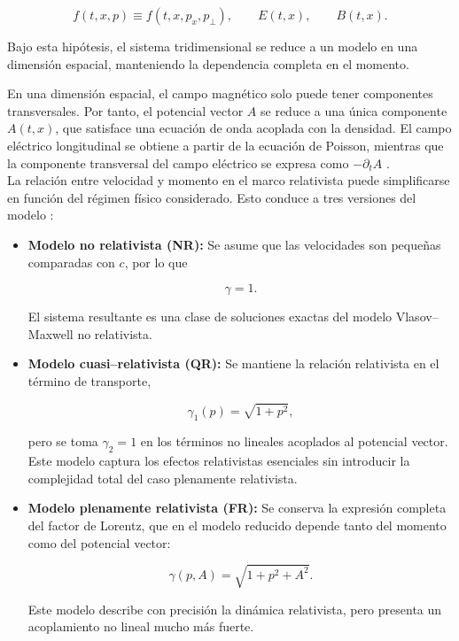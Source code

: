 \documentclass[11pt,a4paper,twoside,pdf]{article}
\numberwithin{equation}{section}
\begin{document}
\[
f(t,x,p) \equiv f(t,x,p_x,p_\perp), \qquad
E(t,x), \qquad B(t,x).
\]


Bajo esta hipótesis, el sistema tridimensional se reduce a un modelo en una dimensión
espacial, manteniendo la dependencia completa en el momento.



En una dimensión espacial, el campo magnético solo puede tener componentes
transversales. Por tanto, el potencial vector $A$ se reduce a una única componente
$A(t,x)$, que satisface una ecuación de onda acoplada con la densidad.
El campo eléctrico longitudinal se obtiene a partir de la ecuación de Poisson, mientras
que la componente transversal del campo eléctrico se expresa como $-\partial_t A$ \cite{martin2021campo}.\\


La relación entre velocidad y momento en el marco relativista puede simplificarse en función del régimen físico
considerado. Esto conduce a tres versiones del modelo \cite{janssen2022gravitacion}:

\begin{itemize}
\item \textbf{Modelo no relativista (NR):}  
Se asume que las velocidades son pequeñas comparadas con $c$, por lo que  


\[
\gamma = 1.
\]


El sistema resultante es una clase de soluciones exactas del modelo
Vlasov–Maxwell no relativista.

\item \textbf{Modelo cuasi–relativista (QR):}  
Se mantiene la relación relativista en el término de transporte,


\[
\gamma_1(p)=\sqrt{1+p^2},
\]


pero se toma $\gamma_2=1$ en los términos no lineales acoplados al potencial
vector. Este modelo captura los efectos relativistas esenciales sin introducir la
complejidad total del caso plenamente relativista.

\item \textbf{Modelo plenamente relativista (FR):}  
Se conserva la expresión completa del factor de Lorentz, que en el modelo
reducido depende tanto del momento como del potencial vector:


\[
\gamma(p,A)=\sqrt{1+p^2 + A^2}.
\]


Este modelo describe con precisión la dinámica relativista, pero presenta un
acoplamiento no lineal mucho más fuerte.
\end{itemize}
\end{document}
